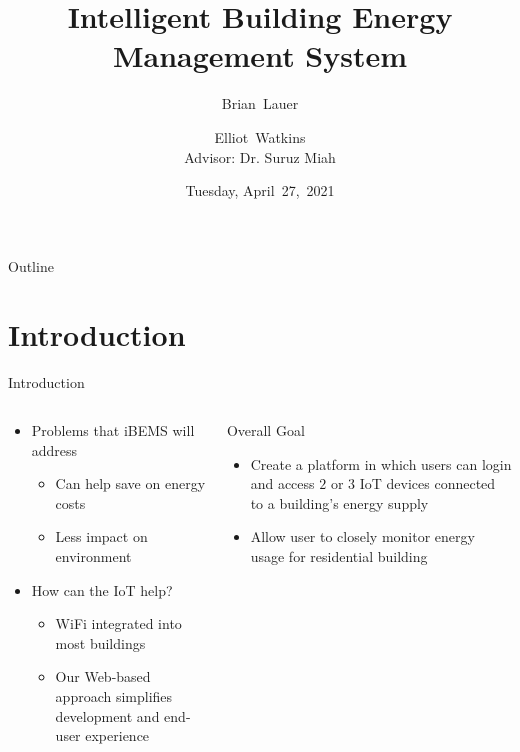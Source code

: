 \documentclass{beamer}
\title[iBEMS]{Intelligent Building Energy Management System}
\author[B.~Lauer, E.~Watkins]{Brian~Lauer \and Elliot~Watkins\\
Advisor: Dr. Suruz Miah}
\institute[Bradley University] %
{
  Department of Electrical and Computer Engineering\\
  Bradley University\\
  1501 W. Bradley Avenue\\
  Peoria, IL, 61625, USA
}
\date[April~27,~2021]{Tuesday, April~27,~2021}
\begin{document}
\begin{frame}
  \titlepage
\end{frame}

\begin{frame}{Outline} %
  \tableofcontents%
\end{frame}

\section{Introduction}

\begin{frame}{Introduction}{} %
  \begin{columns}
    \begin{block}{}
      \begin{small}
        \begin{itemize}
        \item Problems that iBEMS will address
          \begin{itemize}
          \item Can help save on energy costs
          \item Less impact on environment
          \end{itemize}
        \item How can the IoT help?
          \begin{itemize}
          \item WiFi integrated into most buildings
          \item Our Web-based approach simplifies development and end-user experience
          \end{itemize}
        \end{itemize}
      \end{small}
    \end{block}
    {\small
      \begin{block}{Overall Goal}
        \begin{itemize}
        \item Create a platform in which users can login and access $2$ or $3$ IoT devices connected to a building's energy supply
        \item Allow user to closely monitor energy usage for residential building

\end{itemize}
\end{block}}
\end{columns}
\end{frame}
\end{document}
